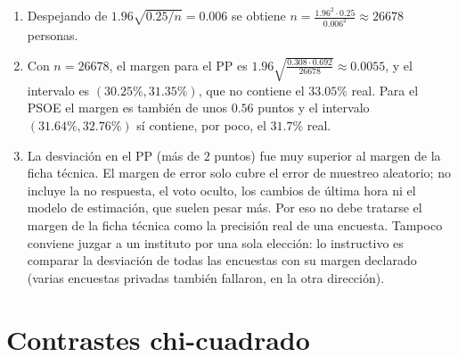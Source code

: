 \documentclass[
  spanish,
  a4paper,
]{scrreport}
\theoremstyle{definition}
\theoremstyle{remark}
\begin{document}
\begin{tcolorbox}[enhanced jigsaw, arc=.35mm, bottomrule=.15mm, bottomtitle=1mm, breakable, colback=white, colbacktitle=quarto-callout-tip-color!10!white, colframe=quarto-callout-tip-color-frame, coltitle=black, left=2mm, leftrule=.75mm, opacityback=0, opacitybacktitle=0.6, rightrule=.15mm, title=\textcolor{quarto-callout-tip-color}{\faLightbulb}\hspace{0.5em}{Solución}, titlerule=0mm, toprule=.15mm, toptitle=1mm]

\begin{enumerate}
\def\labelenumi{\alph{enumi}.}
\item
  Despejando de \(1.96\sqrt{0.25/n}=0.006\) se obtiene
  \(n=\frac{1.96^2\cdot 0.25}{0.006^2}\approx 26678\) personas.
\item
  Con \(n=26678\), el margen para el PP es
  \(1.96\sqrt{\frac{0.308\cdot 0.692}{26678}}\approx 0.0055\), y el
  intervalo es \((30.25\%, 31.35\%)\), que no contiene el \(33.05\)\%
  real. Para el PSOE el margen es también de unos \(0.56\) puntos y el
  intervalo \((31.64\%, 32.76\%)\) sí contiene, por poco, el \(31.7\)\%
  real.
\item
  La desviación en el PP (más de \(2\) puntos) fue muy superior al
  margen de la ficha técnica. El margen de error solo cubre el error de
  muestreo aleatorio; no incluye la no respuesta, el voto oculto, los
  cambios de última hora ni el modelo de estimación, que suelen pesar
  más. Por eso no debe tratarse el margen de la ficha técnica como la
  precisión real de una encuesta. Tampoco conviene juzgar a un instituto
  por una sola elección: lo instructivo es comparar la desviación de
  todas las encuestas con su margen declarado (varias encuestas privadas
  también fallaron, en la otra dirección).
\end{enumerate}

\end{tcolorbox}

\section{Contrastes chi-cuadrado}\label{contrastes-chi-cuadrado}
\end{document}
